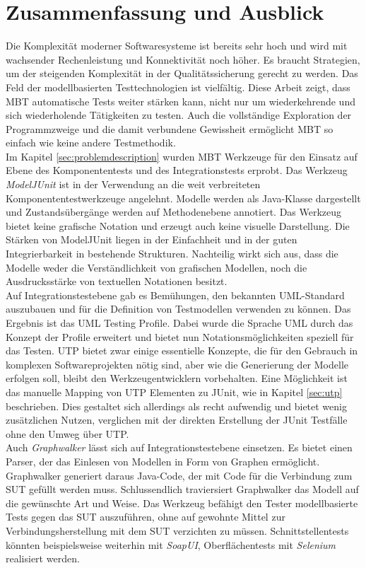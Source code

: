 \section{Zusammenfassung und Ausblick}
\label{sec:conclusion}
Die Komplexität moderner Softwaresysteme ist bereits sehr hoch und wird mit wachsender Rechenleistung und Konnektivität noch höher. Es braucht Strategien, um der steigenden Komplexität in der Qualitätssicherung gerecht zu werden. Das Feld der modellbasierten Testtechnologien ist vielfältig. Diese Arbeit zeigt, dass \Gls{MBT} automatische Tests weiter stärken kann, nicht nur um wiederkehrende und sich wiederholende Tätigkeiten zu testen. Auch die vollständige Exploration der Programmzweige und die damit verbundene Gewissheit ermöglicht \Gls{MBT} so einfach wie keine andere Testmethodik.\\
Im Kapitel \ref{sec:problemdescription}  wurden \Gls{MBT} Werkzeuge für den Einsatz auf Ebene des Komponententests und des Integrationstests erprobt. Das Werkzeug \textit{ModelJUnit} ist in der Verwendung an die weit verbreiteten Komponententestwerkzeuge angelehnt. Modelle werden als Java-Klasse dargestellt und Zustandsübergänge werden auf Methodenebene annotiert. Das Werkzeug bietet keine grafische Notation und erzeugt auch keine visuelle Darstellung. Die Stärken von ModelJUnit liegen in der Einfachheit und in der guten Integrierbarkeit in bestehende Strukturen. Nachteilig wirkt sich aus, dass die Modelle weder die Verständlichkeit von grafischen Modellen, noch die Ausdrucksstärke von textuellen Notationen besitzt.\\
Auf Integrationstestebene gab es Bemühungen, den bekannten UML-Standard auszubauen und für die Definition von Testmodellen verwenden zu können. Das Ergebnis ist das UML Testing Profile. Dabei wurde die Sprache UML durch das Konzept der Profile erweitert und bietet nun Notationsmöglichkeiten speziell für das Testen. \Gls{UTP} bietet zwar einige essentielle Konzepte, die für den Gebrauch in komplexen Softwareprojekten nötig sind, aber wie die Generierung der Modelle erfolgen soll, bleibt den Werkzeugentwicklern vorbehalten. Eine Möglichkeit ist das manuelle Mapping von \Gls{UTP} Elementen zu JUnit, wie in Kapitel \ref{sec:utp} beschrieben. Dies gestaltet sich allerdings als recht aufwendig und bietet wenig zusätzlichen Nutzen, verglichen mit der direkten Erstellung der JUnit Testfälle ohne den Umweg über \Gls{UTP}.\\
Auch \textit{Graphwalker} lässt sich auf Integrationstestebene einsetzen. Es bietet einen Parser, der das Einlesen von Modellen in Form von Graphen ermöglicht. Graphwalker generiert daraus Java-Code, der mit Code für die Verbindung zum \Gls{SUT} gefüllt werden muss. Schlussendlich traviersiert Graphwalker das Modell auf die gewünschte Art und Weise. Das Werkzeug befähigt den Tester modellbasierte Tests gegen das \Gls{SUT} auszuführen, ohne auf gewohnte Mittel zur Verbindungsherstellung mit dem \Gls{SUT} verzichten zu müssen. Schnittstellentests könnten beispielsweise weiterhin mit \textit{SoapUI}, Oberflächentests mit \textit{Selenium} realisiert werden.\\
